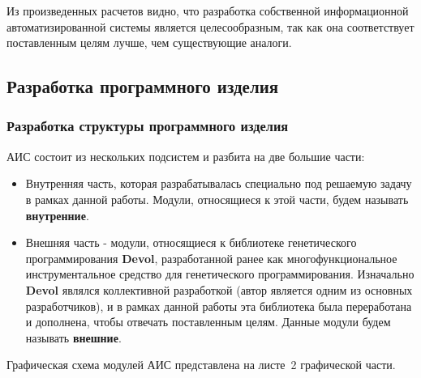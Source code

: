 \documentclass[russian,utf8,emptystyle]{eskdtext}
\begin{document}
Из произведенных расчетов видно, что разработка собственной информационной автоматизированной системы является целесообразным, так как она соответствует поставленным целям лучше, чем существующие аналоги.

\newpage
\subsection{Разработка программного изделия}
\subsubsection{Разработка структуры программного изделия}
АИС состоит из нескольких подсистем и разбита на две большие части:
\begin{itemize}
\item Внутренняя часть, которая разрабатывалась специально под решаемую задачу в рамках данной работы. Модули, относящиеся к этой части, будем называть \textbf{внутренние}. 
\item Внешняя часть - модули, относящиеся к библиотеке генетического программирования \textbf{Devol}, разработанной ранее как многофункциональное инструментальное средство для генетического программирования. Изначально \textbf{Devol} являлся коллективной разработкой (автор является одним из основных разработчиков), и в рамках данной работы эта библиотека была переработана и дополнена, чтобы отвечать поставленным целям. Данные модули будем называть \textbf{внешние}.
\end{itemize}

Графическая схема модулей АИС представлена на листе~2 графической части.
\end{document}
